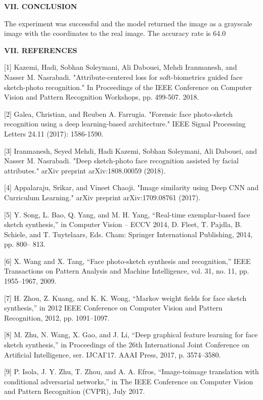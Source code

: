 \documentclass[journal]{IEEEtran} %
\begin{document}
\textbf{VII. CONCLUSION}

The experiment was successful and the model returned the image as a grayscale image with the coordinates to the real image. The accuracy rate is 64.0%




\textbf{\textbf{VII. REFERENCES}}

[1] Kazemi, Hadi, Sobhan Soleymani, Ali Dabouei, Mehdi Iranmanesh, and Nasser M. Nasrabadi. "Attribute-centered loss for soft-biometrics guided face sketch-photo recognition." In Proceedings of the IEEE Conference on Computer Vision and Pattern Recognition Workshops, pp. 499-507. 2018. 

[2] Galea, Christian, and Reuben A. Farrugia. "Forensic face photo-sketch recognition using a deep learning-based architecture." IEEE Signal Processing Letters 24.11 (2017): 1586-1590. 

[3] Iranmanesh, Seyed Mehdi, Hadi Kazemi, Sobhan Soleymani, Ali Dabouei, and Nasser M. Nasrabadi. "Deep sketch-photo face recognition assisted by facial attributes." arXiv preprint arXiv:1808.00059 (2018). 

[4] Appalaraju, Srikar, and Vineet Chaoji. "Image similarity using Deep CNN and Curriculum Learning." arXiv preprint arXiv:1709.08761 (2017). 

[5] Y. Song, L. Bao, Q. Yang, and M. H. Yang, “Real-time
exemplar-based face sketch synthesis,” in Computer Vision –
ECCV 2014, D. Fleet, T. Pajdla, B. Schiele, and T. Tuytelaars,
Eds. Cham: Springer International Publishing, 2014, pp. 800–
813.

[6] X. Wang and X. Tang, “Face photo-sketch synthesis and recognition,” IEEE Transactions on Pattern Analysis and Machine
Intelligence, vol. 31, no. 11, pp. 1955–1967, 2009.

[7] H. Zhou, Z. Kuang, and K. K. Wong, “Markov weight fields for
face sketch synthesis,” in 2012 IEEE Conference on Computer
Vision and Pattern Recognition, 2012, pp. 1091–1097.

[8] M. Zhu, N. Wang, X. Gao, and J. Li, “Deep graphical feature
learning for face sketch synthesis,” in Proceedings of the 26th
International Joint Conference on Artificial Intelligence, ser.
IJCAI’17. AAAI Press, 2017, p. 3574–3580.

[9] P. Isola, J. Y. Zhu, T. Zhou, and A. A. Efros, “Image-toimage translation with conditional adversarial networks,” in The
IEEE Conference on Computer Vision and Pattern Recognition
(CVPR), July 2017.
\end{document}
